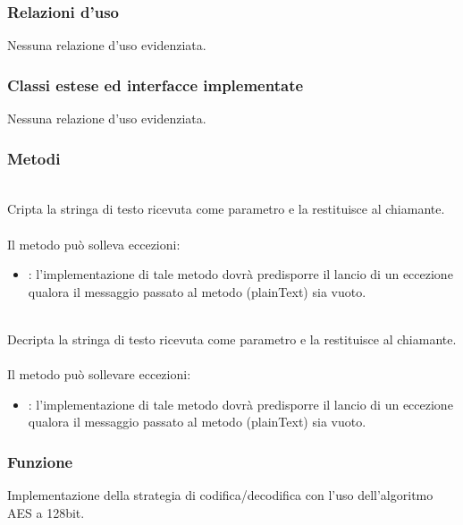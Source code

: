 \subsubsection*{Relazioni d'uso}
Nessuna relazione d'uso evidenziata.

\subsubsection*{Classi estese ed interfacce implementate}

Nessuna relazione d'uso evidenziata.

\subsubsection*{Metodi}
\begin{description}
	\item{}\\
	Cripta la stringa di testo ricevuta come parametro e la restituisce al chiamante.\\\\
	Il metodo può solleva eccezioni:
	\begin{itemize}
		\item {}: l'implementazione di tale metodo dovrà predisporre il lancio di un eccezione qualora il messaggio passato al metodo (plainText) sia vuoto.
	\end{itemize}
	\item{}\\
	Decripta la stringa di testo ricevuta come parametro e la restituisce al chiamante.\\\\
	Il metodo può sollevare eccezioni:
	\begin{itemize}
		\item {}: l'implementazione di tale metodo dovrà predisporre il lancio di un eccezione qualora il messaggio passato al metodo (plainText) sia vuoto.
	\end{itemize}
\end{description}


\subsubsection*{Funzione}
Implementazione della strategia di codifica/decodifica con l'uso dell'algoritmo AES a 128bit.

